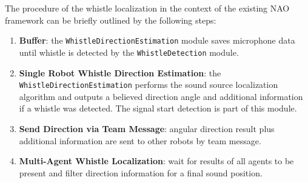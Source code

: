 The procedure of the whistle localization in the context of the existing
NAO framework can be briefly outlined by the following steps:
\begin{enumerate}
      \item \textbf{Buffer}: the \lstinline!WhistleDirectionEstimation! module saves microphone
            data until whistle is detected by the \lstinline!WhistleDetection! module.
      \item \textbf{Single Robot Whistle Direction Estimation}:  the \lstinline!WhistleDirectionEstimation!
            performs the sound source localization algorithm and outputs a
            believed direction angle and additional information if a whistle was detected.
            The signal start detection is part of this module.
      \item \textbf{Send Direction via Team Message}: angular direction result plus additional information
            are sent to other robots by team message.
      \item \textbf{Multi-Agent Whistle Localization}: wait for results of all agents to be present
            and filter direction information for a final sound position.
\end{enumerate}
